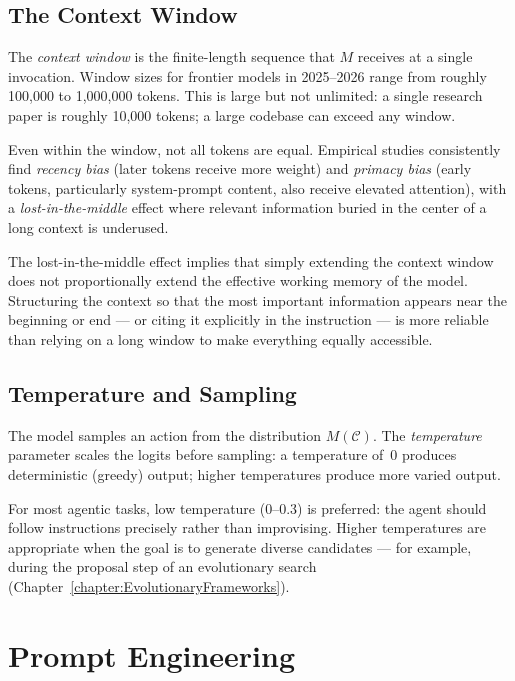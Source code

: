 \subsection{The Context Window}

The \emph{context window} is the finite-length sequence that $M$ receives at a single invocation.
Window sizes for frontier models in 2025–2026 range from roughly 100,000 to 1,000,000 tokens.
This is large but not unlimited: a single research paper is roughly 10,000 tokens; a large codebase can exceed any window.

Even within the window, not all tokens are equal.
Empirical studies consistently find \emph{recency bias} (later tokens receive more weight) and \emph{primacy bias} (early tokens, particularly system-prompt content, also receive elevated attention), with a \emph{lost-in-the-middle} effect where relevant information buried in the center of a long context is underused.

\begin{remark}
The lost-in-the-middle effect implies that simply extending the context window does not proportionally extend the effective working memory of the model.
Structuring the context so that the most important information appears near the beginning or end — or citing it explicitly in the instruction — is more reliable than relying on a long window to make everything equally accessible.
\end{remark}

\subsection{Temperature and Sampling}

The model samples an action from the distribution $M(\mathcal{C})$.
The \emph{temperature} parameter scales the logits before sampling: a temperature of~0 produces deterministic (greedy) output; higher temperatures produce more varied output.

For most agentic tasks, low temperature (0--0.3) is preferred: the agent should follow instructions precisely rather than improvising.
Higher temperatures are appropriate when the goal is to generate diverse candidates — for example, during the proposal step of an evolutionary search (Chapter~\ref{chapter:EvolutionaryFrameworks}).

\section{Prompt Engineering}
\label{section:PromptEngineering}

